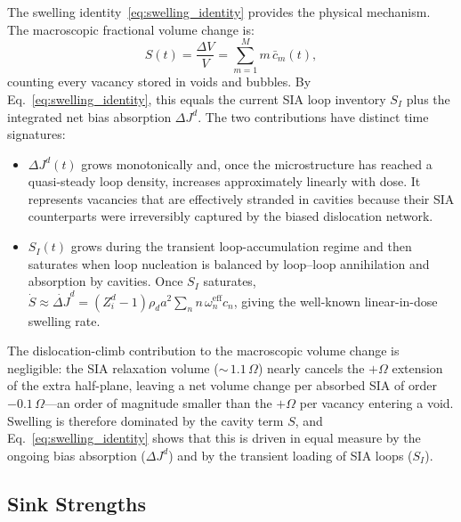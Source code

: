 The swelling identity~\eqref{eq:swelling_identity} provides the
physical mechanism. The macroscopic fractional volume change is:
\begin{equation}\label{eq:swelling}
    S(t) = \frac{\Delta V}{V} = \sum_{m=1}^{M} m\,\bar{c}_m(t),
\end{equation}
counting every vacancy stored in voids and bubbles. By
Eq.~\eqref{eq:swelling_identity}, this equals the current SIA loop
inventory $S_I$ plus the integrated net bias absorption $\Delta J^d$.
The two contributions have distinct time signatures:
\begin{itemize}
    \item $\Delta J^d(t)$ grows monotonically and, once the
    microstructure has reached a quasi-steady loop density, increases
    approximately linearly with dose. It represents vacancies that are
    effectively stranded in cavities because their SIA counterparts were
    irreversibly captured by the biased dislocation network.
    \item $S_I(t)$ grows during the transient loop-accumulation regime
    and then saturates when loop nucleation is balanced by loop--loop
    annihilation and absorption by cavities. Once $S_I$ saturates,
    $\dot{S} \approx \dot{\Delta J}^d = (Z_i^d - 1)\rho_d a^2
    \sum_n n\,\omega_n^{\mathrm{eff}} c_n$, giving the well-known
    linear-in-dose swelling rate.
\end{itemize}

The dislocation-climb contribution to the macroscopic volume change is
negligible: the SIA relaxation volume (${\sim}\,1.1\,\Omega$) nearly
cancels the $+\Omega$ extension of the extra half-plane, leaving a net
volume change per absorbed SIA of order $-0.1\,\Omega$---an order of
magnitude smaller than the $+\Omega$ per vacancy entering a void.
Swelling is therefore dominated by the cavity term $S$, and
Eq.~\eqref{eq:swelling_identity} shows that this is driven in equal
measure by the ongoing bias absorption ($\Delta J^d$) and by the
transient loading of SIA loops ($S_I$).


\subsection{Sink Strengths}
\label{sec:sink_strength}

